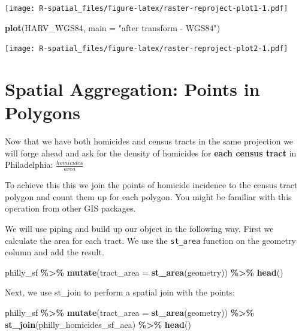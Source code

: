 \documentclass[
]{book}
\newenvironment{Shaded}{\begin{snugshade}}{\end{snugshade}}
\newcommand{\AttributeTok}[1]{\textcolor[rgb]{0.13,0.29,0.53}{#1}}
\newcommand{\FunctionTok}[1]{\textcolor[rgb]{0.13,0.29,0.53}{\textbf{#1}}}
\newcommand{\NormalTok}[1]{#1}
\newcommand{\SpecialCharTok}[1]{\textcolor[rgb]{0.81,0.36,0.00}{\textbf{#1}}}
\newcommand{\StringTok}[1]{\textcolor[rgb]{0.31,0.60,0.02}{#1}}
\begin{document}
\texttt{[image: R-spatial\_files/figure-latex/raster-reproject-plot1-1.pdf]}

\begin{Shaded}
\begin{Highlighting}[]
\FunctionTok{plot}\NormalTok{(HARV\_WGS84, }\AttributeTok{main =} \StringTok{"after transform {-} WGS84"}\NormalTok{)}
\end{Highlighting}
\end{Shaded}

\texttt{[image: R-spatial\_files/figure-latex/raster-reproject-plot2-1.pdf]}

\hypertarget{spatial-aggregation-points-in-polygons}{%
\section{Spatial Aggregation: Points in Polygons}\label{spatial-aggregation-points-in-polygons}}

Now that we have both homicides and census tracts in the same projection we will forge ahead and ask for the density of homicides for \textbf{each census tract} in Philadelphia: \(\frac{{homicides}}{area}\)

To achieve this this we join the points of homicide incidence to the census tract polygon and count them up for each polygon. You might be familiar with this operation from other GIS packages.

We will use piping and build up our object in the following way. First we calculate the area for each tract. We use the \texttt{st\_area} function on the geometry column and add the result.

\begin{Shaded}
\begin{Highlighting}[]
\NormalTok{philly\_sf }\SpecialCharTok{\%\textgreater{}\%} 
  \FunctionTok{mutate}\NormalTok{(}\AttributeTok{tract\_area =} \FunctionTok{st\_area}\NormalTok{(geometry)) }\SpecialCharTok{\%\textgreater{}\%} 
  \FunctionTok{head}\NormalTok{()}
\end{Highlighting}
\end{Shaded}

Next, we use st\_join to perform a spatial join with the points:

\begin{Shaded}
\begin{Highlighting}[]
\NormalTok{philly\_sf }\SpecialCharTok{\%\textgreater{}\%} 
  \FunctionTok{mutate}\NormalTok{(}\AttributeTok{tract\_area =} \FunctionTok{st\_area}\NormalTok{(geometry)) }\SpecialCharTok{\%\textgreater{}\%} 
  \FunctionTok{st\_join}\NormalTok{(philly\_homicides\_sf\_aea) }\SpecialCharTok{\%\textgreater{}\%}
  \FunctionTok{head}\NormalTok{()}
\end{Highlighting}
\end{Shaded}
\end{document}
